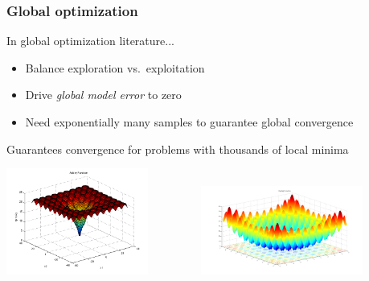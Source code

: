 \documentclass[aspectratio=169]{beamer}
\begin{document}
\begin{frame}
\frametitle{Global optimization}
In global optimization literature...
\begin{itemize}
\item Balance exploration vs.\ exploitation
\item Drive {\sl global model error} to zero
\item Need exponentially many samples to guarantee global convergence
\end{itemize}

Guarantees convergence for problems with thousands of local minima

\begin{center}
\includegraphics[width=0.35\textwidth]{../img/moo_new/ackley.png}
$\qquad\qquad$
\includegraphics[width=0.4\textwidth]{../img/moo_new/rastrigin.png}
\end{center}

\end{frame}
\end{document}
